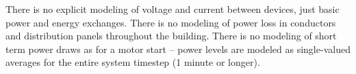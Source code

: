 There is no explicit modeling of voltage and current between devices, just basic power and energy exchanges.  There is no modeling of power loss in conductors and distribution panels throughout the building.  There is no modeling of short term power draws as for a motor start -- power levels are modeled as single-valued averages for the entire system timestep (1 minute or longer).